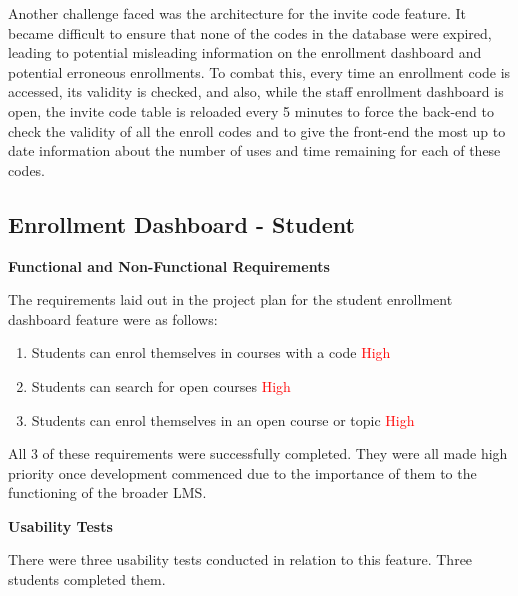 Another challenge faced was the architecture for the invite code feature. It became difficult to ensure that none of the codes in the database were expired, leading to potential misleading information on the enrollment dashboard and potential erroneous enrollments. To combat this, every time an enrollment code is accessed, its validity is checked, and also, while the staff enrollment dashboard is open, the invite code table is reloaded every 5 minutes to force the back-end to check the validity of all the enroll codes and to give the front-end the most up to date information about the number of uses and time remaining for each of these codes.

\subsection{Enrollment Dashboard - Student}
\textbf{Functional and Non-Functional Requirements}

The requirements laid out in the project plan for the student enrollment dashboard feature were as follows:
    \begin{enumerate}
    \item Students can enrol themselves in courses with a code \textcolor{Red}{High}
    \item Students can search for open courses \textcolor{Red}{High}
    \item Students can enrol themselves in an open course or topic \textcolor{Red}{High}
    \end{enumerate}
All 3 of these requirements were successfully completed. They were all made high priority once development commenced due to the importance of them to the functioning of the broader LMS.

\textbf{Usability Tests}

There were three usability tests conducted in relation to this feature. Three students completed them.

